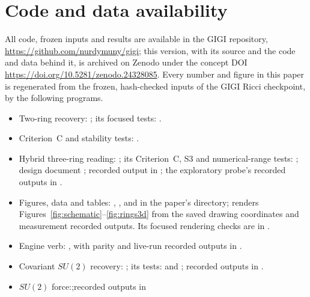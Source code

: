 \documentclass[11pt]{article}
\theoremstyle{definition}
\theoremstyle{remark}
\newcommand{\GIGI}{\textsc{GIGI}}
\newcommand{\BW}{Criterion~C}
\begin{document}
\section*{Code and data availability}
All code, frozen inputs and results are available in the \GIGI{} repository,
\url{https://github.com/nurdymuny/gigi}; this version, with its source and the code and data behind it, is archived on Zenodo under the
concept DOI \url{https://doi.org/10.5281/zenodo.24328085}. Every number and figure in this paper is regenerated from the frozen, hash-checked
inputs of the \GIGI{} Ricci checkpoint, by the following programs.
\begin{itemize}
  \item Two-ring recovery: ; its focused tests:
    .
  \item \BW{} and stability tests: .
  \item Hybrid three-ring reading: ; its \BW{}, S3 and
    numerical-range tests: ; design document
    ; recorded output in\newline
    ; the exploratory probe's recorded outputs in\newline
    .
  \item Figures, data and tables: , ,
     and  in the paper's directory;
     renders Figures~\ref{fig:schematic}--\ref{fig:rings3d}
    from the saved drawing coordinates and measurement recorded outputs. Its focused rendering
    checks are in .
  \item Engine verb: , with parity and live-run
    recorded outputs in .
  \item Covariant $SU(2)$ recovery: ; its tests:\newline
     and\newline
    ;\newline
    recorded outputs in .
  \item $SU(2)$ force:\newline {};\newline recorded outputs in

\end{itemize}
\end{document}
